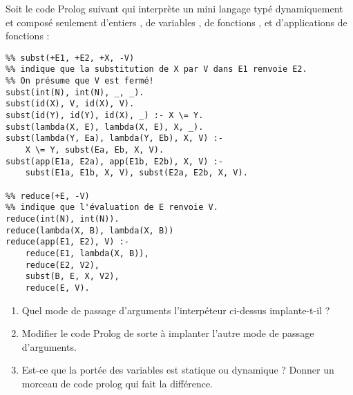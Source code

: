 \begin{Exercise}
Soit le code Prolog suivant qui interprète un mini langage typé
dynamiquement et composé seulement d'entiers , de
variables , de fonctions ,
et d'applications de fonctions :

\begin{verbatim}
%% subst(+E1, +E2, +X, -V)
%% indique que la substitution de X par V dans E1 renvoie E2.
%% On présume que V est fermé!
subst(int(N), int(N), _, _).
subst(id(X), V, id(X), V).
subst(id(Y), id(Y), id(X), _) :- X \= Y.
subst(lambda(X, E), lambda(X, E), X, _).
subst(lambda(Y, Ea), lambda(Y, Eb), X, V) :-
    X \= Y, subst(Ea, Eb, X, V).
subst(app(E1a, E2a), app(E1b, E2b), X, V) :-
    subst(E1a, E1b, X, V), subst(E2a, E2b, X, V).

%% reduce(+E, -V)
%% indique que l'évaluation de E renvoie V.
reduce(int(N), int(N)).
reduce(lambda(X, B), lambda(X, B))
reduce(app(E1, E2), V) :-
    reduce(E1, lambda(X, B)),
    reduce(E2, V2),
    subst(B, E, X, V2),
    reduce(E, V).
\end{verbatim}

\begin{enumerate}

\item Quel mode de passage d'arguments l'interpéteur ci-dessus implante-t-il ?
\item Modifier le code Prolog de sorte à implanter l'autre mode de
  passage d'arguments.
\item Est-ce que la portée des variables est statique ou dynamique ?
  Donner un morceau de code prolog qui fait la différence.

\end{enumerate}
\end{Exercise}